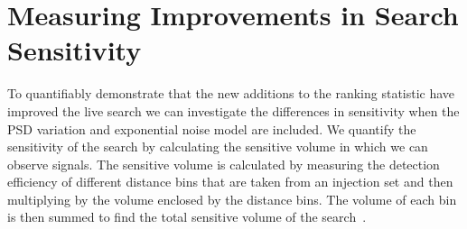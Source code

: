   
  


\section{\label{5:sec:injection-tests}Measuring Improvements in Search Sensitivity}

To quantifiably demonstrate that the new additions to the ranking statistic have improved the live search we can investigate the differences in sensitivity when the PSD variation and exponential noise model are included. We quantify the sensitivity of the search by calculating the sensitive volume in which we can observe \gwadj signals. The sensitive volume is calculated by measuring the detection efficiency of different distance bins that are taken from an injection set and then multiplying by the volume enclosed by the distance bins. The volume of each bin is then summed to find the total sensitive volume of the search~\cite{rw_snr_eq:2012}.

